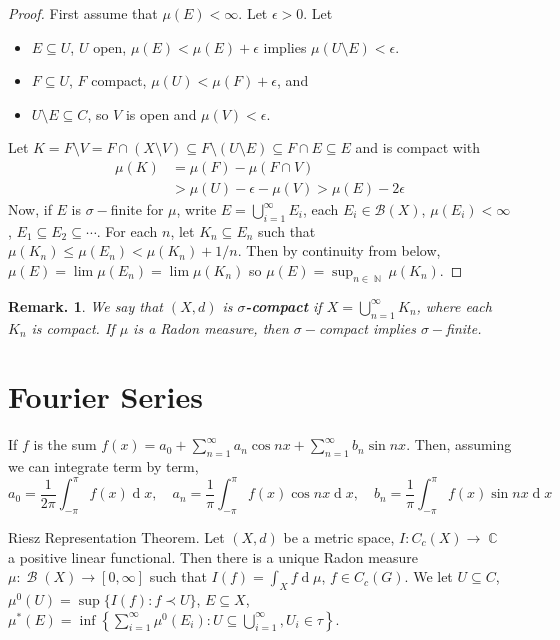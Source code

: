 \documentclass[12pt, a4paper]{memoir}
\DeclareMathOperator{\N}{{\mathbb{N}}}
\DeclareMathOperator{\C}{{\mathbb{C}}}
\newcommand{\mbf}[1]{{\bfseries\boldmath #1}}
\theoremstyle{nonumberplain}
\newtheorem{remark}{Remark.}
\newtheorem{proof}{Proof}
\DeclareMathOperator{\B}{\mathcal{B}}
\renewcommand{\d}[1]{\ensuremath{\operatorname{d}\!{#1}}} %
\begin{document}
\begin{proof}
    First assume that $\mu(E)<\infty$.
    Let $\epsilon>0$.
    Let
    \begin{itemize}[nolistsep]
        \item $E\subseteq U$, $U$ open, $\mu(E)<\mu(E)+\epsilon$ implies $\mu(U\setminus E)<\epsilon$.
        \item $F\subseteq U$, $F$ compact, $\mu(U)<\mu(F)+\epsilon$, and
        \item $U\setminus E\subseteq C$, so $V$ is open and $\mu(V)<\epsilon$.
    \end{itemize}
    Let $K=F\setminus V=F\cap(X\setminus V)\subseteq F\setminus(U\setminus E)\subseteq F\cap E\subseteq E$ and is compact with
    \begin{align*}
        \mu(K) &= \mu(F)-\mu(F\cap V)\\
               &> \mu(U)-\epsilon-\mu(V)>\mu(E)-2\epsilon
    \end{align*}
    Now, if $E$ is $\sigma-$finite for $\mu$, write $E=\bigcup_{i=1}^\infty E_i$, each $E_i\in\mathcal{B}(X)$, $\mu(E_i)<\infty$, $E_1\subseteq E_2\subseteq\cdots$.
    For each $n$, let $K_n\subseteq E_n$ such that $\mu(K_n)\leq\mu(E_n)<\mu(K_n)+1/n$.
    Then by continuity from below, $\mu(E)=\lim\mu(E_n)=\lim\mu(K_n)$ so $\mu(E)=\sup_{n\in\N}\mu(K_n)$.
\end{proof}
\begin{remark}
    We say that $(X,d)$ is \mbf{$\sigma$-compact} if $X=\bigcup_{n=1}^\infty K_n$, where each $K_n$ is compact.
    If $\mu$ is a Radon measure, then $\sigma-$compact implies $\sigma-$finite.
\end{remark}
\chapter{Fourier Series}
If $f$ is the sum $f(x)=a_0+\sum_{n=1}^\infty a_n\cos nx+\sum_{n=1}^\infty b_n\sin nx$.
Then, assuming we can integrate term by term,
\begin{equation*}
    a_0=\frac{1}{2\pi}\int_{-\pi}^\pi f(x)\d{x},\quad a_n=\frac{1}{\pi}\int_{-\pi}^\pi f(x)\cos nx\d{x},\quad b_n=\frac{1}{\pi}\int_{-\pi}^\pi f(x)\sin nx\d{x}
\end{equation*}

Riesz Representation Theorem.
Let $(X,d)$ be a metric space, $I:C_c(X)\to\C$ a positive linear functional.
Then there is a unique Radon measure $\mu:\B(X)\to[0,\infty]$ such that $I(f)=\int_X f\d{\mu}$, $f\in C_c(G)$.
We let $U\subseteq C$, $\mu^0(U)=\sup\{I(f):f\prec U\}$, $E\subseteq X$, $\mu^*(E)=\inf\left\{\sum_{i=1}^\infty\mu^0(E_i):U\subseteq\bigcup_{i=1}^\infty,U_i\in\tau\right\}$.
\end{document}
